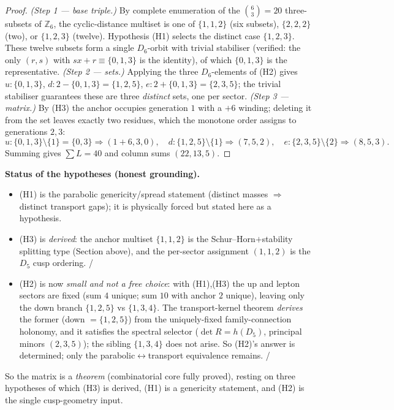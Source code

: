 \begin{proof}
\emph{(Step 1 --- base triple.)} By complete enumeration of the $\binom63=20$ three-subsets of
$\mathbb Z_6$, the cyclic-distance multiset is one of $\{1,1,2\}$ (six subsets), $\{2,2,2\}$ (two), or
$\{1,2,3\}$ (twelve). Hypothesis (H1) selects the distinct case $\{1,2,3\}$. These twelve subsets form a
single $D_6$-orbit with trivial stabiliser (verified: the only $(r,s)$ with $sx+r\equiv\{0,1,3\}$ is the
identity), of which $\{0,1,3\}$ is the representative. \emph{(Step 2 --- sets.)} Applying the three
$D_6$-elements of (H2) gives $u:\{0,1,3\}$, $d:2{-}\{0,1,3\}=\{1,2,5\}$, $e:2{+}\{0,1,3\}=\{2,3,5\}$;
the trivial stabiliser guarantees these are three \emph{distinct} sets, one per sector.
\emph{(Step 3 --- matrix.)} By (H3) the anchor occupies generation $1$ with a $+6$ winding; deleting it
from the set leaves exactly two residues, which the monotone order assigns to generations $2,3$:
\[
  u:\{0,1,3\}\!\setminus\!\{1\}=\{0,3\}\Rightarrow(1{+}6,3,0),\quad
  d:\{1,2,5\}\!\setminus\!\{1\}\Rightarrow(7,5,2),\quad
  e:\{2,3,5\}\!\setminus\!\{2\}\Rightarrow(8,5,3).
\]
Summing gives $\sum L=40$ and column sums $(22,13,5)$.
\end{proof}

\noindent\textbf{Status of the hypotheses (honest grounding).}
\begin{itemize}[leftmargin=1.6em]
\item (H1) is the parabolic genericity/spread statement (distinct masses $\Rightarrow$ distinct
transport gaps); it is physically forced but stated here as a hypothesis. \mC
\item (H3) is \emph{derived}: the anchor multiset $\{1,1,2\}$ is the Schur--Horn$+$stability splitting
type (Section above), and the per-sector assignment $(1,1,2)$ is the $D_5$ cusp ordering. \mE/\mC
\item (H2) is now \emph{small and not a free choice}: with (H1),(H3) the up and lepton sectors are fixed
(sum $4$ unique; sum $10$ with anchor $2$ unique), leaving only the down branch $\{1,2,5\}$ vs
$\{1,3,4\}$. The transport-kernel theorem \emph{derives} the former (down $=\{1,2,5\}$) from the
uniquely-fixed family-connection holonomy, and it satisfies the spectral selector ($\det R=h(D_5)$,
principal minors $(2,3,5)$); the sibling $\{1,3,4\}$ does not arise. So (H2)'s answer is determined; only
the parabolic$\leftrightarrow$transport equivalence remains. \mE/\mC
\end{itemize}
So the matrix is a \emph{theorem} (combinatorial core fully proved), resting on three hypotheses of which
(H3) is derived, (H1) is a genericity statement, and (H2) is the single cusp-geometry input.

